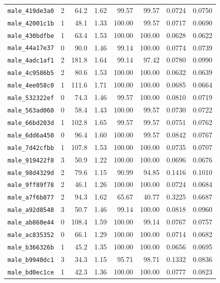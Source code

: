 \begin{longtable}{lrrrrrrr}
\texttt{male\_419de3a0} & 2 & 64.2 & 1.62 & 99.57 & 99.57 & 0.0724 & 0.0750 \\
\texttt{male\_42001c1b} & 1 & 48.1 & 1.33 & 100.00 & 99.57 & 0.0717 & 0.0690 \\
\texttt{male\_430bdfbe} & 1 & 63.4 & 1.53 & 100.00 & 100.00 & 0.0628 & 0.0622 \\
\texttt{male\_44a17e37} & 0 & 90.0 & 1.46 & 99.14 & 100.00 & 0.0774 & 0.0739 \\
\texttt{male\_4adc1af1} & 2 & 181.8 & 1.64 & 99.14 & 97.42 & 0.0780 & 0.0990 \\
\texttt{male\_4c9586b5} & 2 & 80.6 & 1.53 & 100.00 & 100.00 & 0.0632 & 0.0639 \\
\texttt{male\_4ee058c0} & 1 & 111.6 & 1.71 & 100.00 & 100.00 & 0.0685 & 0.0664 \\
\texttt{male\_532322ef} & 0 & 74.3 & 1.46 & 99.57 & 100.00 & 0.0810 & 0.0719 \\
\texttt{male\_563ad060} & 0 & 58.4 & 1.43 & 100.00 & 99.57 & 0.0730 & 0.0722 \\
\texttt{male\_66bd203d} & 1 & 102.8 & 1.65 & 99.57 & 99.57 & 0.0751 & 0.0762 \\
\texttt{male\_6dd6a450} & 0 & 96.4 & 1.60 & 100.00 & 99.57 & 0.0842 & 0.0767 \\
\texttt{male\_7d42cfbb} & 1 & 107.8 & 1.53 & 100.00 & 100.00 & 0.0735 & 0.0707 \\
\texttt{male\_919422f8} & 3 & 50.9 & 1.22 & 100.00 & 100.00 & 0.0696 & 0.0676 \\
\texttt{male\_98d4329d} & 2 & 79.6 & 1.15 & 90.99 & 94.85 & 0.1416 & 0.1010 \\
\texttt{male\_9ff89f78} & 2 & 46.1 & 1.26 & 100.00 & 100.00 & 0.0724 & 0.0684 \\
\texttt{male\_a7f6b877} & 2 & 94.3 & 1.62 & 65.67 & 40.77 & 0.3225 & 0.6687 \\
\texttt{male\_a92d8548} & 3 & 50.7 & 1.46 & 99.14 & 100.00 & 0.0818 & 0.0960 \\
\texttt{male\_ab860e44} & 0 & 108.4 & 1.59 & 100.00 & 99.14 & 0.0767 & 0.0757 \\
\texttt{male\_ac835352} & 0 & 66.1 & 1.29 & 100.00 & 100.00 & 0.0714 & 0.0682 \\
\texttt{male\_b366326b} & 1 & 45.2 & 1.35 & 100.00 & 100.00 & 0.0656 & 0.0695 \\
\texttt{male\_b9940dc1} & 3 & 34.3 & 1.15 & 95.71 & 98.71 & 0.1332 & 0.0836 \\
\texttt{male\_bd0ec1ce} & 1 & 42.3 & 1.36 & 100.00 & 100.00 & 0.0777 & 0.0823 \\

\end{longtable}
